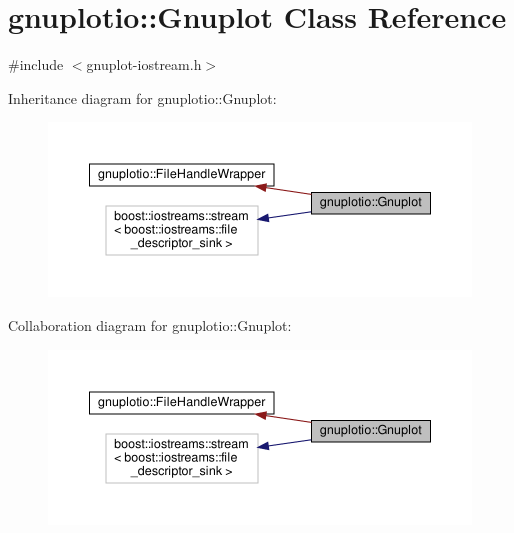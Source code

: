 \hypertarget{classgnuplotio_1_1_gnuplot}{}\section{gnuplotio\+:\+:Gnuplot Class Reference}
\label{classgnuplotio_1_1_gnuplot}


{\ttfamily \#include $<$gnuplot-\/iostream.\+h$>$}



Inheritance diagram for gnuplotio\+:\+:Gnuplot\+:
\nopagebreak
\begin{figure}[H]
\begin{center}
\leavevmode
\includegraphics[width=350pt]{classgnuplotio_1_1_gnuplot__inherit__graph}
\end{center}
\end{figure}


Collaboration diagram for gnuplotio\+:\+:Gnuplot\+:
\nopagebreak
\begin{figure}[H]
\begin{center}
\leavevmode
\includegraphics[width=350pt]{classgnuplotio_1_1_gnuplot__coll__graph}
\end{center}
\end{figure}

